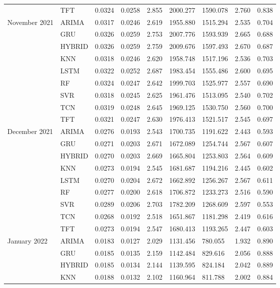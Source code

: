 \begin{tabular}{lllllllll}
 & TFT & 0.0324 & 0.0258 & 2.855 & 2000.277 & 1590.078 & 2.760 & 0.838 \\
November 2021 & ARIMA & 0.0317 & 0.0246 & 2.619 & 1955.880 & 1515.294 & 2.535 & 0.704 \\
 & GRU & 0.0326 & 0.0259 & 2.753 & 2007.776 & 1593.939 & 2.665 & 0.688 \\
 & HYBRID & 0.0326 & 0.0259 & 2.759 & 2009.676 & 1597.493 & 2.670 & 0.687 \\
 & KNN & 0.0318 & 0.0246 & 2.620 & 1958.748 & 1517.196 & 2.536 & 0.703 \\
 & LSTM & 0.0322 & 0.0252 & 2.687 & 1983.454 & 1555.486 & 2.600 & 0.695 \\
 & RF & 0.0324 & 0.0247 & 2.642 & 1999.703 & 1525.977 & 2.557 & 0.690 \\
 & SVR & 0.0318 & 0.0245 & 2.625 & 1961.476 & 1513.095 & 2.540 & 0.702 \\
 & TCN & 0.0319 & 0.0248 & 2.645 & 1969.125 & 1530.750 & 2.560 & 0.700 \\
 & TFT & 0.0321 & 0.0247 & 2.630 & 1976.413 & 1521.517 & 2.545 & 0.697 \\
December 2021 & ARIMA & 0.0276 & 0.0193 & 2.543 & 1700.735 & 1191.622 & 2.443 & 0.593 \\
 & GRU & 0.0271 & 0.0203 & 2.671 & 1672.089 & 1254.744 & 2.567 & 0.607 \\
 & HYBRID & 0.0270 & 0.0203 & 2.669 & 1665.804 & 1253.803 & 2.564 & 0.609 \\
 & KNN & 0.0273 & 0.0194 & 2.545 & 1681.687 & 1194.216 & 2.445 & 0.602 \\
 & LSTM & 0.0270 & 0.0204 & 2.672 & 1662.892 & 1256.267 & 2.567 & 0.611 \\
 & RF & 0.0277 & 0.0200 & 2.618 & 1706.872 & 1233.273 & 2.516 & 0.590 \\
 & SVR & 0.0289 & 0.0206 & 2.703 & 1782.209 & 1268.609 & 2.597 & 0.553 \\
 & TCN & 0.0268 & 0.0192 & 2.518 & 1651.867 & 1181.298 & 2.419 & 0.616 \\
 & TFT & 0.0273 & 0.0194 & 2.547 & 1680.413 & 1193.265 & 2.447 & 0.603 \\
January 2022 & ARIMA & 0.0183 & 0.0127 & 2.029 & 1131.456 & 780.055 & 1.932 & 0.890 \\
 & GRU & 0.0185 & 0.0135 & 2.159 & 1142.484 & 829.616 & 2.056 & 0.888 \\
 & HYBRID & 0.0185 & 0.0134 & 2.144 & 1139.595 & 824.184 & 2.042 & 0.889 \\
 & KNN & 0.0188 & 0.0132 & 2.102 & 1160.964 & 811.788 & 2.002 & 0.884 \\

\end{tabular}
